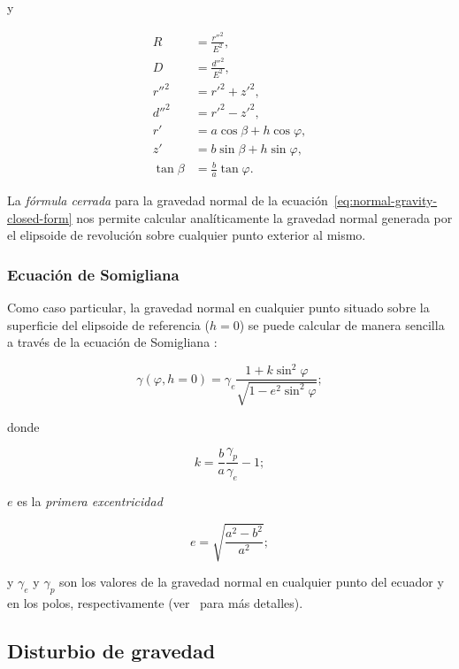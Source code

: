 \noindent y

\begin{align}
    R &= \frac{{r''}^2}{E^2}, \\
    D &= \frac{{d''}^2}{E^2}, \\
    {r''}^2 &= {r'}^2 + {z'}^2, \\
    {d''}^2 &= {r'}^2 - {z'}^2, \\
    r' &= a\cos\beta + h\cos\varphi, \\
    z' &= b\sin\beta + h\sin\varphi, \\
    \tan\beta &= \frac{b}{a}\tan\varphi.
\end{align}

La \emph{fórmula cerrada} para la gravedad normal de la
ecuación~\ref{eq:normal-gravity-closed-form} nos permite calcular
analíticamente la gravedad normal generada por el elipsoide de revolución sobre
cualquier punto exterior al mismo.

\subsubsection{Ecuación de Somigliana}

Como caso particular, la gravedad normal en cualquier punto situado sobre la
superficie del elipsoide de referencia ($h=0$) se puede calcular de manera
sencilla a través de la ecuación de Somigliana \citep{heiskanen1967}:

\begin{equation}
    \gamma(\varphi, h=0) =
        \gamma_e
        \frac{1 + k \sin^2\varphi}{\sqrt{1 - e^2 \sin^2\varphi}};
    \label{eq:somigliana}
\end{equation}

\noindent donde

\begin{equation}
    k = \frac{b}{a} \frac{\gamma_p}{\gamma_e} - 1;
\end{equation}

\noindent $e$ es la \emph{primera excentricidad}

\begin{equation}
    e = \sqrt{\frac{a^2 - b^2}{a^2}};
\end{equation}

\noindent y $\gamma_e$ y $\gamma_p$ son los valores de la gravedad normal en
cualquier punto del ecuador y en los polos, respectivamente
(ver~\citealp[][p.~68--69,]{heiskanen1967} para más detalles).


\subsection{Disturbio de gravedad}

